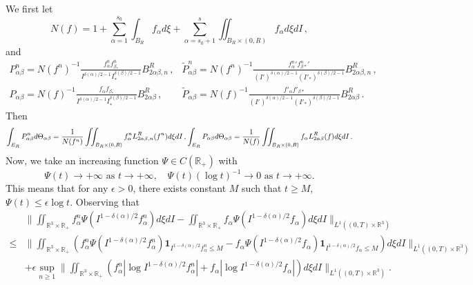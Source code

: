 \documentclass[reqno,11pt]{amsart}
\numberwithin{equation}{section}
\def\R{\mathbb{R}}
\begin{document}
We first let
\begin{equation}\label{Nf}
	N (f) = 1 + \sum_{\alpha = 1}^{s_0} \int_{B_R} f_\alpha d \xi + \sum_{\alpha = s_0 + 1}^{s} \iint_{B_R \times (0, R)} f_\alpha d \xi d I \,,
\end{equation}
and
\begin{equation*}
	\begin{aligned}
		P^n_{\alpha \beta}  = N  (f^n)^{-1} \tfrac{f^n_\alpha f^n_{\beta_* }}{I^{\delta(\alpha)/2-1} I_* ^{\delta(\beta)/2-1}} B^R_{2 \alpha \beta, n} \,, &\tilde{P}^n_{\alpha \beta} = N (f^n)^{-1} \tfrac{ {f_\alpha^n}' {f_{\beta *}^n}' }{(I')^{\delta(\alpha)/2-1} (I'_* )^{\delta(\beta)/2-1}} B^R_{2 \alpha \beta, n} \,,\\
		P_{\alpha \beta}  =N  (f )^{-1} \tfrac{f_\alpha f_{\beta_* }}{I^{\delta(\alpha)/2-1} I_* ^{\delta(\beta)/2-1}} B^R_{2 \alpha \beta} \,,& \tilde{P}_{\alpha \beta} = N  (f )^{-1} \tfrac{ {f'_\alpha} f'_{\beta *} }{(I')^{\delta(\alpha)/2-1} (I'_* )^{\delta(\beta)/2-1}} B^R_{2 \alpha \beta} \,.
	\end{aligned}
\end{equation*}
Then
\begin{equation*}{\small
		\begin{aligned}
			\int_{E_R}P^n_{\alpha \beta}  d \Theta_{\alpha \beta} = \frac{1}{N  (f^n)}  \iint_{B_R \times (0, R)} f^n_\alpha L^R_{2\alpha \beta, n }(f^n) d \xi d I \,, \int_{E_R}P_{\alpha \beta}   d \Theta_{\alpha \beta} = \frac{1}{N  (f )}\iint_{B_R \times (0, R)} f_\alpha L^R_{2\alpha \beta }(f) d \xi d I \,.
	\end{aligned}}
\end{equation*}
Now, we take an increasing function $\Psi \in C(\R_+) $ with
\begin{equation}
	\Psi (t) \rightarrow +\infty \text{ as } t\rightarrow +\infty, \quad \Psi (t)(\log t)^{-1}\rightarrow 0 \text{ as } t\rightarrow +\infty.
\end{equation}
This means that for any $\epsilon>0$, there exists constant $M$ such that $t\geq M$, $\Psi (t) \leq \epsilon     \log   t  .$  Observing that
\begin{align*}
&\| \iint_{ \R^3 \times \R_+} f^n_\alpha \Psi (I^{1-\delta(\alpha) / 2}f^n_\alpha ) d\xi dI - \iint_{ \R^3 \times \R_+} f _\alpha \Psi (I^{1-\delta(\alpha) / 2}f_\alpha  ) d\xi dI \|_{L^1((0,T) \times \R^3)} \\
\leq & \|\iint_{ \R^3 \times \R_+} (f^n_\alpha \Psi (I^{1-\delta(\alpha) / 2}f^n_\alpha )\mathbf{1}_{I^{1-\delta(\alpha) / 2}f^n_\alpha \leq M  }  - f _\alpha \Psi (I^{1-\delta(\alpha) / 2}f_\alpha  )\mathbf{1}_{I^{1-\delta(\alpha) / 2}f_\alpha  \leq M  }) d\xi dI\|_{L^1((0,T) \times \R^3)} \\
& + \epsilon \sup_{n \geq 1} \|\iint_{ \R^3 \times \R_+} (f^n_\alpha | \log   I^{1-\delta(\alpha) / 2}f^n_\alpha |   + f _\alpha| \log I^{1-\delta(\alpha) / 2}f_\alpha|   ) d\xi dI\|_{L^1((0,T) \times \R^3)}.
\end{align*} 
\end{document}
